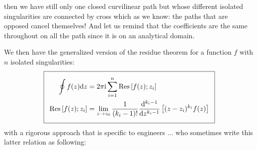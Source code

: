 	then we have still only one closed curvilinear path but whose different isolated singularities are connected by cross which as we know: the paths that are opposed cancel themselves! And let us remind that the coefficients are the same throughout on all the path since it is on an analytical domain.
	
	We then have the generalized version of the residue theorem for a function $f$ with $n$ isolated singularities:
	\begin{equation}
  		\addtolength{\fboxsep}{5pt}
	   \boxed{
	   \begin{gathered}
	   		\begin{aligned}
			\oint f(z)\mathrm{d}z&=2\pi\mathrm{i}\sum_{i=1}^n \text{Res}\left[f(z);z_i\right]\\
			\text{Res}\left[f(z);z_i\right]&=\lim_{z \rightarrow z_0}\dfrac{1}{(k_i-1)!}\dfrac{\mathrm{d}^{k_i-1}}{\mathrm{d}z^{k_i-1}}\left[(z-z_i)^{k_i}f(z)\right]
	   		\end{aligned}
	   \end{gathered}
	   }
	\end{equation}
	with a rigorous approach that is specific to engineers ... who sometimes write this latter relation as following:
	
